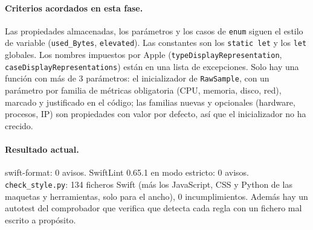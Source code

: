 \documentclass[11pt,a4paper]{article}
\begin{document}
\paragraph{Criterios acordados en esta fase.} Las propiedades
almacenadas, los parámetros y los casos de \texttt{enum} siguen el
estilo de variable (\texttt{used\_Bytes}, \texttt{elevated}). Las
constantes son los \texttt{static let} y los \texttt{let} globales.
Los nombres impuestos por Apple
(\texttt{typeDisplayRepresentation},
\texttt{caseDisplayRepresentations}) están en una lista de
excepciones. Solo hay una función con más de 3 parámetros: el
inicializador de \texttt{RawSample}, con un parámetro por familia de
métricas obligatoria (CPU, memoria, disco, red), marcado y
justificado en el código; las familias nuevas y opcionales (hardware,
procesos, IP) son propiedades con valor por defecto, así que el
inicializador no ha crecido.

\paragraph{Resultado actual.} swift-format: 0 avisos. SwiftLint
0.65.1 en modo estricto: 0 avisos. \texttt{check\_style.py}: 134
ficheros Swift (más los JavaScript, CSS y Python de las maquetas y
herramientas, solo para el ancho), 0 incumplimientos. Además hay un autotest del
comprobador que verifica que detecta cada regla con un fichero mal
escrito a propósito.
\end{document}
